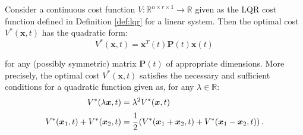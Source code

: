 \documentclass[a4paper,11pt]{book}
\numberwithin{figure}{chapter}
\numberwithin{equation}{chapter}
\numberwithin{table}{chapter}
\newtheorem{theorem}{Theorem}[chapter]
\theoremstyle{definition}
\newcounter{boxed-theorem}
\newenvironment{boxed-theorem}[1]
{\colorlet{shadecolor}{pastelBlue2!10} \begin{shaded} \begin{theorem}{#1}}
{\end{theorem} \end{shaded}}
\newcounter{boxed-definition}
\newcounter{boxed-example}
\begin{document}
\begin{boxed-theorem}{} \label{th:costQuadraForm}
    Consider a continuous cost function $V : \mathbb{R}^{n \times r \times 1} \rightarrow \mathbb{R}$ given as the LQR cost function defined in Definition \ref{def:lqr} for a linear system. Then the optimal cost $V^*(\bm{x}, t)$ has the quadratic form:
    \begin{equation}
        V^*(\bm{x}, t) = \bm{x}^T(t) \bm{P}(t) \bm{x}(t)
    \end{equation}
    
\noindent for any (possibly symmetric) matrix $\bm{P}(t)$ of appropriate dimensions. More precisely, the optimal cost $V^*(\bm{x}, t)$ satisfies the necessary and sufficient conditions for a quadratic function given as, for any $\lambda \in \mathbb{R}$:
    \begin{align} 
        V^*(\lambda \bm{x}, t) &= \lambda^2 V^*(\bm{x}, t) \label{eq:costQuadraForm021} \\ 
        V^*(\bm{x}_1 , t) + V^*(\bm{x}_2 , t) &= \cfrac{1}{2} \left( V^*(\bm{x}_1 + \bm{x}_2 , t) + V^*(\bm{x}_1 - \bm{x}_2 , t) \right) \label{eq:costQuadraForm022}
    .\end{align}
\end{boxed-theorem}
\end{document}
